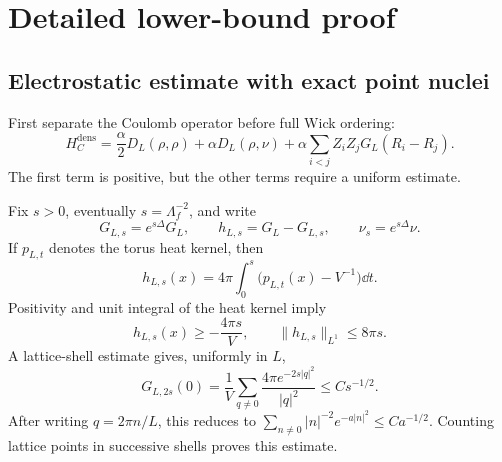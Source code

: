 \section{Detailed lower-bound proof}
\label{sec:lower-proof}

\subsection{Electrostatic estimate with exact point nuclei}
First separate the Coulomb operator before full Wick ordering:
\begin{equation}
H_C^{\mathrm{dens}}=
\frac{\alpha}{2}D_L(\rho,\rho)+\alpha D_L(\rho,\nu)
+\alpha\sum_{i<j}Z_iZ_jG_L(R_i-R_j).
\label{eq:density-coulomb}
\end{equation}
The first term is positive, but the other terms require a uniform estimate.

Fix \(s>0\), eventually \(s=\Lambda_f^{-2}\), and write
\begin{equation}
G_{L,s}=e^{s\Delta}G_L,\qquad
h_{L,s}=G_L-G_{L,s},\qquad \nu_s=e^{s\Delta}\nu.
\end{equation}
If \(p_{L,t}\) denotes the torus heat kernel, then
\begin{equation}
h_{L,s}(x)=4\pi\int_0^s\bigl(p_{L,t}(x)-V^{-1}\bigr)\dd t.
\end{equation}
Positivity and unit integral of the heat kernel imply
\begin{equation}
h_{L,s}(x)\ge-\frac{4\pi s}{V},\qquad
\|h_{L,s}\|_{L^1}\le8\pi s.
\label{eq:heat-bounds}
\end{equation}
A lattice-shell estimate gives, uniformly in \(L\),
\begin{equation}
G_{L,2s}(0)=\frac1V\sum_{q\ne0}
\frac{4\pi e^{-2s|q|^2}}{|q|^2}\le Cs^{-1/2}.
\label{eq:heat-self}
\end{equation}
After writing \(q=2\pi n/L\), this reduces to
\(\sum_{n\ne0}|n|^{-2}e^{-a|n|^2}\le C a^{-1/2}\).
Counting lattice points in successive shells proves this estimate.

